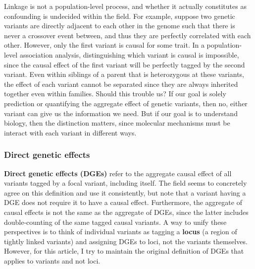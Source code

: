 \documentclass[12pt]{article}
\begin{document}
Linkage is not a population-level process, and whether it actually constitutes as confounding is undecided within the field.
For example, suppose two genetic variants are directly adjacent to each other in the genome such that there is never a crossover event between, and thus they are perfectly correlated with each other.
However, only the first variant is causal for some trait.
In a population-level association analysis, distinguishing which variant is causal is impossible, since the causal effect of the first variant will be perfectly tagged by the second variant.
Even within siblings of a parent that is heterozygous at these variants, the effect of each variant cannot be separated since they are always inherited together even within families.
Should this trouble us?
If our goal is solely prediction or quantifying the aggregate effect of genetic variants, then no, either variant can give us the information we need.
But if our goal is to understand biology, then the distinction matters, since molecular mechanisms must be interact with each variant in different ways.

\subsubsection{Direct genetic effects}
\textbf{Direct genetic effects (DGEs)} refer to the aggregate causal effect of all variants tagged by a focal variant, including itself.
The field seems to concretely agree on this definition and use it consistently, but note that a variant having a DGE does not require it to have a causal effect.
Furthermore, the aggregate of causal effects is not the same as the aggregate of DGEs, since the latter includes double-counting of the same tagged causal variants.
A way to unify these perspectives is to think of individual variants as tagging a \textbf{locus} (a region of tightly linked variants) and assigning DGEs to loci, not the variants themselves.
However, for this article, I try to maintain the original definition of DGEs that applies to variants and not loci.

\end{document}
